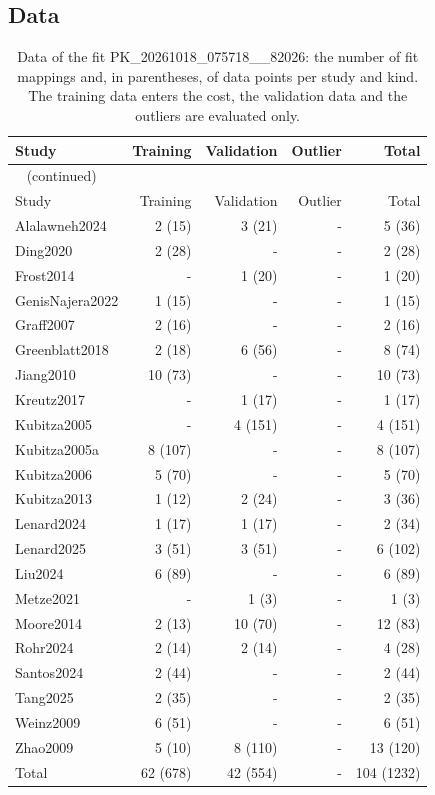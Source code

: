 \subsection{Data}

\begin{longtable}{lrrrr}
\caption{Data of the fit PK\_20261018\_075718\_\_82026: the number of fit mappings and, in parentheses, of data points per study and kind. The training data enters the cost, the validation data and the outliers are evaluated only.}\label{tab:data:PK_20261018_075718__82026} \\
\toprule
Study & Training & Validation & Outlier & Total \\
\midrule
\endfirsthead
\multicolumn{5}{l}{\small\tablename~\thetable{} (continued)} \\
\toprule
Study & Training & Validation & Outlier & Total \\
\midrule
\endhead
\bottomrule
\endlastfoot
Alalawneh2024 & 2 (15) & 3 (21) & - & 5 (36) \\
Ding2020 & 2 (28) & - & - & 2 (28) \\
Frost2014 & - & 1 (20) & - & 1 (20) \\
GenisNajera2022 & 1 (15) & - & - & 1 (15) \\
Graff2007 & 2 (16) & - & - & 2 (16) \\
Greenblatt2018 & 2 (18) & 6 (56) & - & 8 (74) \\
Jiang2010 & 10 (73) & - & - & 10 (73) \\
Kreutz2017 & - & 1 (17) & - & 1 (17) \\
Kubitza2005 & - & 4 (151) & - & 4 (151) \\
Kubitza2005a & 8 (107) & - & - & 8 (107) \\
Kubitza2006 & 5 (70) & - & - & 5 (70) \\
Kubitza2013 & 1 (12) & 2 (24) & - & 3 (36) \\
Lenard2024 & 1 (17) & 1 (17) & - & 2 (34) \\
Lenard2025 & 3 (51) & 3 (51) & - & 6 (102) \\
Liu2024 & 6 (89) & - & - & 6 (89) \\
Metze2021 & - & 1 (3) & - & 1 (3) \\
Moore2014 & 2 (13) & 10 (70) & - & 12 (83) \\
Rohr2024 & 2 (14) & 2 (14) & - & 4 (28) \\
Santos2024 & 2 (44) & - & - & 2 (44) \\
Tang2025 & 2 (35) & - & - & 2 (35) \\
Weinz2009 & 6 (51) & - & - & 6 (51) \\
Zhao2009 & 5 (10) & 8 (110) & - & 13 (120) \\
Total & 62 (678) & 42 (554) & - & 104 (1232) \\
\end{longtable}

